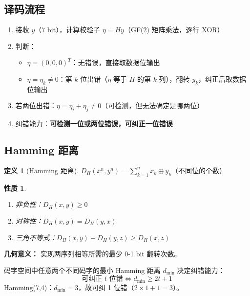 \documentclass[12pt,a4paper]{ctexart}
\newtheorem{property}[theorem]{性质}
\theoremstyle{definition}
\newtheorem{definition}[theorem]{定义}
\begin{document}
\subsection{译码流程}

\begin{enumerate}[nosep]
  \item 接收 $y$（7 bit），计算校验子 $\eta = Hy$（GF(2) 矩阵乘法，逐行 XOR）
  \item 判断：
  \begin{itemize}[nosep]
    \item $\eta = (0,0,0)^T$：无错误，直接取数据位输出
    \item $\eta = \eta_k \neq 0$：第 $k$ 位出错（$\eta$ 等于 $H$ 的第 $k$ 列），翻转 $y_k$，纠正后取数据位输出
  \end{itemize}
  \item 若两位出错：$\eta = \eta_i + \eta_j \neq 0$（可检测，但无法确定是哪两位）
  \item 纠错能力：\textbf{可检测一位或两位错误，可纠正一位错误}
\end{enumerate}

\subsection{Hamming 距离}

\begin{definition}[Hamming 距离]
$D_H(x^n, y^n) = \sum_{k=1}^{n} x_k \oplus y_k$（不同位的个数）
\end{definition}

\begin{property}
\begin{enumerate}[label=(\arabic*),nosep]
  \item 非负性：$D_H(x,y) \geq 0$
  \item 对称性：$D_H(x,y) = D_H(y,x)$
  \item 三角不等式：$D_H(x,y) + D_H(y,z) \geq D_H(x,z)$
\end{enumerate}
\end{property}

\textbf{几何意义：} 实现两序列相等所需的最少 0-1 bit 翻转次数。

\begin{keybox}[最小距离与纠错能力]
码字空间中任意两个不同码字的最小 Hamming 距离 $d_{\min}$ 决定纠错能力：
\[
\text{可纠正 } t \text{ 位错} \iff d_{\min} \geq 2t + 1
\]
Hamming(7,4)：$d_{\min} = 3$，故可纠 1 位错（$2 \times 1 + 1 = 3$）。
\end{keybox}
\end{document}

